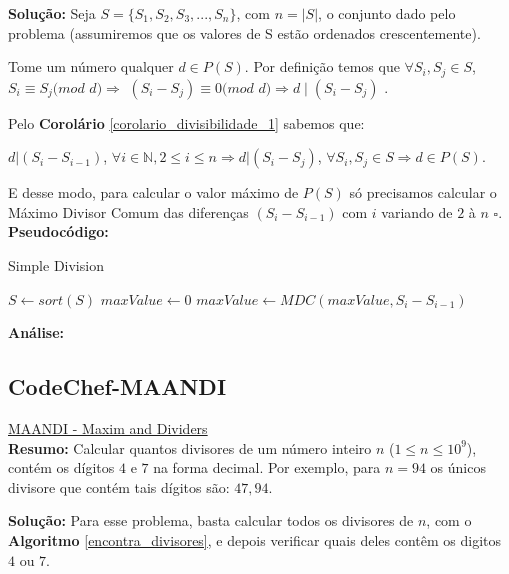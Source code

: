 \textbf{Solução:} 
Seja $S = \{S_1, S_2, S_3, ..., S_n\}$, com $n = |S|$, o conjunto dado pelo problema (assumiremos que os valores de S estão ordenados crescentemente).

Tome um número qualquer $d \in P(S)$. Por definição temos que $\forall S_i, S_j \in S$, $S_i \equiv S_j ( mod$ $d) \Rightarrow $ 
$ (S_i-S_j) \equiv 0 ( mod$ $d) \Rightarrow d \mid (S_i-S_j)$ .

Pelo \textbf{Corolário} \autoref{corolario_divisibilidade_1} sabemos que:

$d | (S_i-S_{i-1})$, $ \forall i \in \mathbb{N}, 2 \leq i \leq n \Rightarrow d | (S_i-S_j)$, $ \forall S_i, S_j \in S \Rightarrow d \in P(S)$.

E desse modo, para calcular o valor máximo de $P(S)$ só precisamos calcular o Máximo Divisor Comum das diferenças $(S_i-S_{i-1})$ com $i$ variando de $2$ à $n$ $\square$.
\\

\textbf{Pseudocódigo:}
\begin{algorithm}
\caption{Simple Division}\label{euclid}
\begin{algorithmic}[1]
\State $S \gets sort(S)$  
\State $maxValue \gets 0$
\State $maxValue \gets MDC(maxValue, S_i - S_{i-1})$
\EndFor
\State {}
\EndProcedure
\end{algorithmic}
\end{algorithm}

\textbf{Análise:}



\subsection{CodeChef-MAANDI}
\href{https://www.codechef.com/problems/MAANDI}{MAANDI - Maxim and Dividers}\\

\textbf{Resumo:}
Calcular quantos divisores de um número inteiro $n$ ($1\leq n \leq 10^9$), contém os dígitos $4$ e $7$ na forma decimal.
Por exemplo, para $n=94$ os únicos divisore que contém tais dígitos são: $47, 94$.

\textbf{Solução:}
Para esse problema, basta calcular todos os divisores de $n$, com o \textbf{Algoritmo} \autoref{encontra_divisores}, e depois verificar quais deles contêm os digitos $4$ ou $7$.

